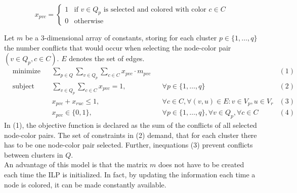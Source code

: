 \begin{equation}
  x_{pvc}=\begin{cases}
      1 & \text{if } v \in Q_p \text{ is selected and colored with color } c \in C\\
      0 & \text{otherwise}
    \end{cases}
  \label{eq4}
\end{equation}

Let $m$ be a 3-dimensional array of constants, storing for each cluster $p \in \{1,\ldots , q\}$ the number conflicts that would occur when selecting the node-color pair $(v \in Q_p, c \in C)$. $E$ denotes the set of edges.
\begin{equation*}
\begin{aligned}
& \text{minimize} && \sum_{p \in Q}\sum_{v \in Q_p}\sum_{c \in C} x_{pvc} \cdot m_{pvc}                    &&&(1)\\
& \text{subject to} && \sum_{v \in Q_p}\sum_{c \in C} x_{pvc}=1, && \forall p \in \{1,\ldots , q\}    &(2)\\
&&& x_{pvc}+x_{ruc} \leq 1, && \forall c \in C, \forall (v,u) \in E : v\in V_p, u\in V_r     &(3)\\
&&& x_{pvc} \in \{0,1\}, && \forall p \in \{1,\ldots , q\}, \forall v \in Q_p, \forall c \in C         &(4)
\end{aligned}
\end{equation*}
In (1), the objective function is declared as the sum of the conflicts of all selected node-color pairs. The set of constraints in (2) demand, that for each cluster there has to be one node-color pair selected. Further, inequations (3) prevent conflicts between clusters in $Q$.\\
An advantage of this model is that the matrix $m$ does not have to be created each time the ILP is initialized. In fact, by updating the information each time a node is colored, it can be made constantly available.


